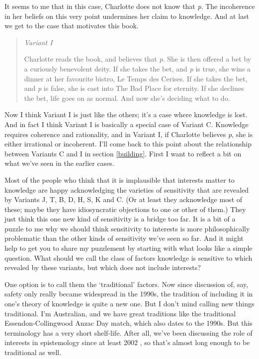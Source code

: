 \documentclass[
  11pt,
]{book}
\begin{document}
It seems to me that in this case, Charlotte does not know that \emph{p}. The incoherence in her beliefs on this very point undermines her claim to knowledge. And at last we get to the case that motivates this book.

\begin{quote}
\emph{Variant I}

Charlotte reads the book, and believes that \emph{p}. She is then offered a bet by a curiously benevolent deity. If she takes the bet, and \emph{p} is true, she wins a dinner at her favourite bistro, Le Temps des Cerises. If she takes the bet, and \emph{p} is false, she is cast into The Bad Place for eternity. If she declines the bet, life goes on as normal. And now she's deciding what to do.
\end{quote}

Now I think Variant I is just like the others; it's a case where knowledge is lost. And in fact I think Variant I is basically a special case of Variant C. Knowledge requires coherence and rationality, and in Variant I, if Charlotte believes \emph{p}, she is either irrational or incoherent. I'll come back to this point about the relationship between Variants C and I in section \ref{building}. First I want to reflect a bit on what we've seen in the earlier cases.

Most of the people who think that it is implausible that interests matter to knowledge are happy acknowledging the varieties of sensitivity that are revealed by Variants J, T, B, D, H, S, K and C. (Or at least they acknowledge most of these; maybe they have idiosyncratic objections to one or other of them.) They just think this one new kind of sensitivity is a bridge too far. It is a bit of a puzzle to me why we should think sensitivity to interests is more philosophically problematic than the other kinds of sensitivity we've seen so far. And it might help to get you to share my puzzlement by starting with what looks like a simple question. What should we call the class of factors knowledge is sensitive to which revealed by these variants, but which does not include interests?

One option is to call them the `traditional' factors. Now since discussion of, say, safety only really became widespread in the 1990s, the tradition of including it in one's theory of knowledge is quite a new one. But I don't mind calling new things traditional. I'm Australian, and we have great traditions like the traditional Essendon-Collingwood Anzac Day match, which also dates to the 1990s. But this terminology has a very short shelf-life. After all, we've been discussing the role of interests in epistemology since at least 2002 \citep{FantlMcGrath2002}, so that's almost long enough to be traditional as well.
\end{document}

